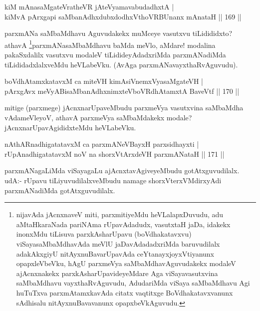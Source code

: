 
\begin{shl}
kiM mAnasaMgateVratheVR jAteVyamavabudadhxtA | \\
kiMvA pArxgapi saMbanAdhxdubxdodhxV\s thoVR\s BUnanx mAnataH \hfill||  169 ||  
\end{shl}

\begin{artha}
parxmANa saMbaMdhavu Aguvudakekx muMceye vasutxvu tiLidididxto? athavA \footnote{nijavAda jAcnxnaveV miti, parxmitiyeMdu heVLalapxDuvudu, adu aMtaHkaraNada pariNAma rUpavAdadudx, vasutxtaH jaDa, idakekx inonxMdu tiLisuva parxkAsharUpavu (boVdhakatavxvu) viSayasaMbaMdhavAda meVlU jaDavAdadadxriMda baruvudilalx adakAkxgiyU nitAyxnuBavarUpavAda ceYtanayxjoyxVtiyanunx opapxleVbeVku, hAgU parxmeVya saMbaMdhavAguvudakekx modaleV ajAcnxnakekx parxkAsharUpavideyeMdare Aga viSayavasutxvina saMbaMdhavu vayxthaRvAguvudu, AdudariMda viSaya saMbaMdhavu Agi huTuTxva parxmAtamxkavAda citatx vaqtitxge BoVdhakatavxvanunx sAdhisalu nitAyxnuBavavanunx opapxbeVkAguvudu.}parxmANasaMbaMdhavu baMda meVlo, aMdare! modalina pakaSxdalilx vasutxvu modaleV tiLidideyAdadxriMda parxmANadiMda tiLididadxlalxveMdu heVLabeVku. (AvAga parxmANavayxthaRvAguvudu).
\end{artha}

\begin{shl}
boVdhAtamxkatavxM ca miteVH kimAsiVnemxVyasaMgateVH | \\
pArxgAvx meVyABisaMbanAdhxnimxteVboVRdhAtamxtA BaveVtf \hfill||  170 ||  
\end{shl}

\begin{artha}
mitige (parxmege) jAcnxnarUpaveMbudu parxmeVya vasutxvina saMbaMdha vAdameVleyoV, athavA parxmeVya saMbaMdakekx modale? jAcnxnarUpavAgididxteMdu heVLabeVku.
\end{artha}


\begin{shl}
nAthARnadhigatatavxM ca parxmANeVBayxH parxsidhayxti | \\
rUpAnadhigatatavxM noV na shorxVtArxdeVH parxmANataH \hfill||  171 ||  
\end{shl}

\begin{artha}
parxmANagaLiMda viSayagaLu ajAcnxtavAgiveyeMbudu gotAtxguvudilalx. udA:- rUpavu tiLiyuvudilalxveMbudu namage shorxVterxVMdirxyAdi parxmANadiMda gotAtxguvudilalx.
\end{artha}

